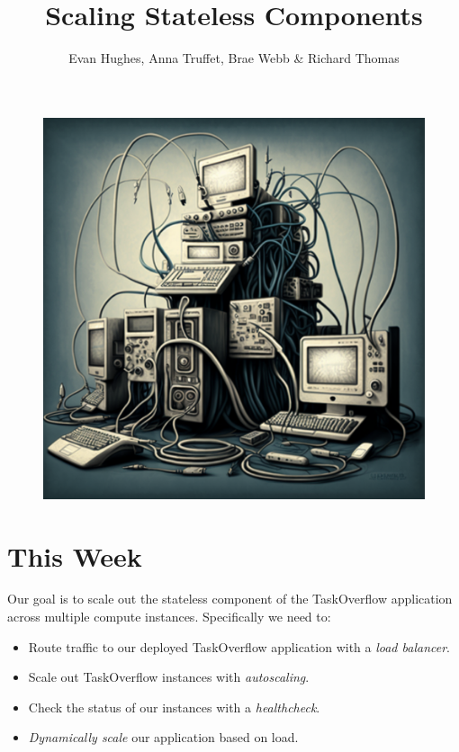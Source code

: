 \documentclass{csse4400}
\title{Scaling Stateless Components}
\author{Evan Hughes, Anna Truffet, Brae Webb \& Richard Thomas}
\date{\week[practical]{6}}
\begin{document}
\maketitle

\begin{figure}[h]
    \begin{center}
        \includegraphics[scale=0.4]{images/scaling-out}
    \end{center}
\end{figure}



\section{This Week}
Our goal is to scale out the stateless component of the TaskOverflow application across multiple compute instances.
Specifically we need to:
\begin{itemize}[topsep=4pt,partopsep=1pt,itemsep=2pt,parsep=2pt]
    \item Route traffic to our deployed TaskOverflow application with a \textsl{load balancer}.
    \item Scale out TaskOverflow instances with \textsl{autoscaling}.
    \item Check the status of our instances with a \textsl{healthcheck}.
    \item \textsl{Dynamically scale} our application based on load.
\end{itemize}
\end{document}
